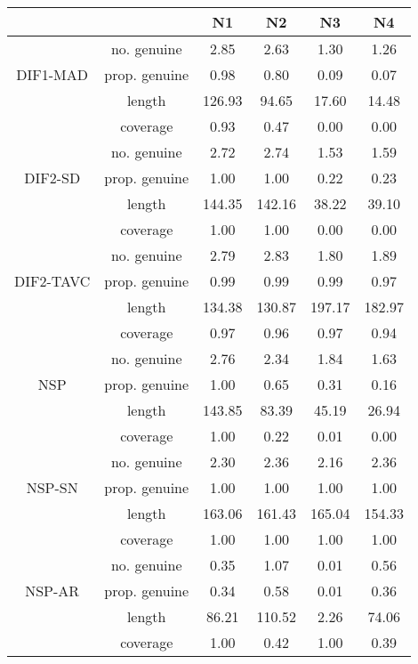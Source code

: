 \begin{tabular}{|c|c|c|c|c|c|}
  \hline
 &  & N1 & N2 & N3 & N4 \\ 
  \hline
 & no. genuine & 2.85 & 2.63 & 1.30 & 1.26 \\ 
  DIF1-MAD & prop. genuine & 0.98 & 0.80 & 0.09 & 0.07 \\ 
   & length & 126.93 & 94.65 & 17.60 & 14.48 \\ 
   & coverage & 0.93 & 0.47 & 0.00 & 0.00 \\ 
   & no. genuine & 2.72 & 2.74 & 1.53 & 1.59 \\ 
  DIF2-SD & prop. genuine & 1.00 & 1.00 & 0.22 & 0.23 \\ 
   & length & 144.35 & 142.16 & 38.22 & 39.10 \\ 
   & coverage & 1.00 & 1.00 & 0.00 & 0.00 \\ 
   & no. genuine & 2.79 & 2.83 & 1.80 & 1.89 \\ 
  DIF2-TAVC & prop. genuine & 0.99 & 0.99 & 0.99 & 0.97 \\ 
   & length & 134.38 & 130.87 & 197.17 & 182.97 \\ 
   & coverage & 0.97 & 0.96 & 0.97 & 0.94 \\ 
   & no. genuine & 2.76 & 2.34 & 1.84 & 1.63 \\ 
  NSP & prop. genuine & 1.00 & 0.65 & 0.31 & 0.16 \\ 
   & length & 143.85 & 83.39 & 45.19 & 26.94 \\ 
   & coverage & 1.00 & 0.22 & 0.01 & 0.00 \\ 
   & no. genuine & 2.30 & 2.36 & 2.16 & 2.36 \\ 
  NSP-SN & prop. genuine & 1.00 & 1.00 & 1.00 & 1.00 \\ 
   & length & 163.06 & 161.43 & 165.04 & 154.33 \\ 
   & coverage & 1.00 & 1.00 & 1.00 & 1.00 \\ 
   & no. genuine & 0.35 & 1.07 & 0.01 & 0.56 \\ 
  NSP-AR & prop. genuine & 0.34 & 0.58 & 0.01 & 0.36 \\ 
   & length & 86.21 & 110.52 & 2.26 & 74.06 \\ 
   & coverage & 1.00 & 0.42 & 1.00 & 0.39 \\ 
   \hline
\end{tabular}
